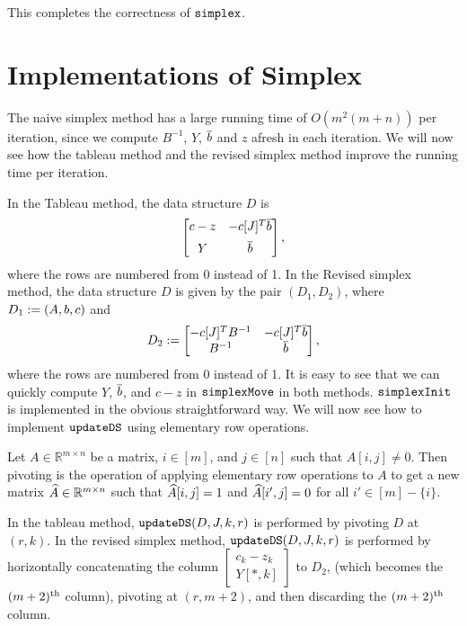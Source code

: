 This completes the correctness of $\operatorname{\mathtt{simplex}}$.

\section{Implementations of Simplex}

The naive simplex method has a large running time of $O(m^2(m + n))$ per iteration,
since we compute $B^{-1}$, $Y$, $\overline{b}$ and $z$ afresh in each iteration.
We will now see how the tableau method and the revised simplex method
improve the running time per iteration.

In the Tableau method, the data structure $D$ is
\[ \begin{bmatrix} c - z & -c[J]^T\overline{b} \\[0.5em] Y & \overline{b} \end{bmatrix}, \]
where the rows are numbered from 0 instead of 1.
In the Revised simplex method, the data structure $D$ is given by
the pair $(D_1, D_2)$, where $D_1 := (A, b, c)$ and
\[ D_2 := \begin{bmatrix} -c[J]^TB^{-1} & -c[J]^T\overline{b} \\ B^{-1} & \overline{b} \end{bmatrix}, \]
where the rows are numbered from 0 instead of 1.
It is easy to see that we can quickly compute $Y$, $\overline{b}$, and $c-z$
in $\operatorname{\mathtt{simplexMove}}$ in both methods.
$\operatorname{\mathtt{simplexInit}}$ is implemented in the obvious straightforward way.
We will now see how to implement $\operatorname{\mathtt{updateDS}}$ using elementary row operations.

\begin{definition}[pivoting]
Let $A \in \mathbb{R}^{m \times n}$ be a matrix, $i \in [m]$, and $j \in [n]$
such that $A[i, j] \neq 0$. Then pivoting is the operation of applying
elementary row operations to $A$ to get a new matrix $\widehat{A} \in \mathbb{R}^{m \times n}$
such that $\widehat{A}[i, j] = 1$ and $\widehat{A}[i', j] = 0$ for all $i' \in [m] - \{i\}$.
\end{definition}

In the tableau method, $\operatorname{\mathtt{updateDS}}(D, J, k, r)$ is performed by pivoting $D$ at $(r, k)$.
In the revised simplex method, $\operatorname{\mathtt{updateDS}}(D, J, k, r)$ is performed by
horizontally concatenating the column
$\begin{bmatrix}c_k - z_k \\ Y[*, k] \end{bmatrix}$ to $D_2$,
(which becomes the $(m+2)^{\textrm{th}}$ column), pivoting at $(r, m+2)$,
and then discarding the $(m+2)^{\textrm{th}}$ column.

